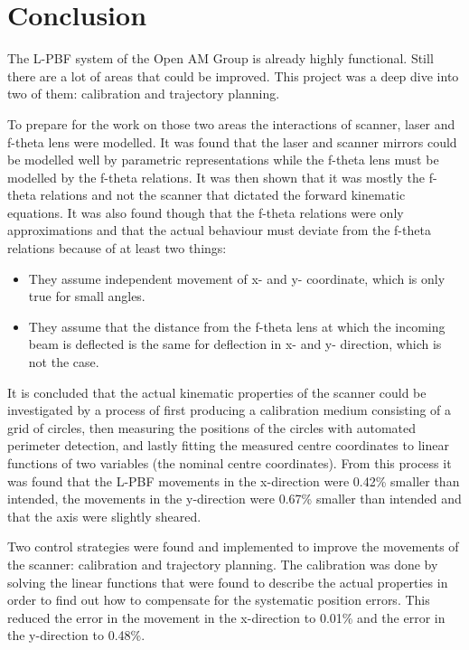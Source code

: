 \chapter{Conclusion}

The L-PBF system of the Open AM Group is already highly functional. Still there are a lot of areas that could be improved. This project was a deep dive into two of them: calibration and trajectory planning.

To prepare for the work on those two areas the interactions of scanner, laser and f-theta lens were modelled. It was found that the laser and scanner mirrors could be modelled well by parametric representations while the f-theta lens must be modelled by the f-theta relations. It was then shown that it was mostly the f-theta relations and not the scanner that dictated the forward kinematic equations. It was also found though that the f-theta relations were only approximations and that the actual behaviour must deviate from the f-theta relations because of at least two things:

\begin{itemize}
    \item They assume independent movement of x- and y- coordinate, which is only true for small angles.
    \item They assume that the distance from the f-theta lens at which the incoming beam is deflected is the same for deflection in x- and y- direction, which is not the case.
\end{itemize}

It is concluded that the actual kinematic properties of the scanner could be investigated by a process of first producing a calibration medium consisting of a grid of circles, then measuring the positions of the circles with automated perimeter detection, and lastly fitting the measured centre coordinates to linear functions of two variables (the nominal centre coordinates). From this process it was found that the L-PBF movements in the x-direction were 0.42\% smaller than intended, the movements in the y-direction were 0.67\% smaller than intended and that the axis were slightly sheared.

Two control strategies were found and implemented to improve the movements of the scanner: calibration and trajectory planning. The calibration was done by solving the linear functions that were found to describe the actual properties in order to find out how to compensate for the systematic position errors. This reduced the error in the movement in the x-direction to 0.01\% and the error in the y-direction to 0.48\%.

